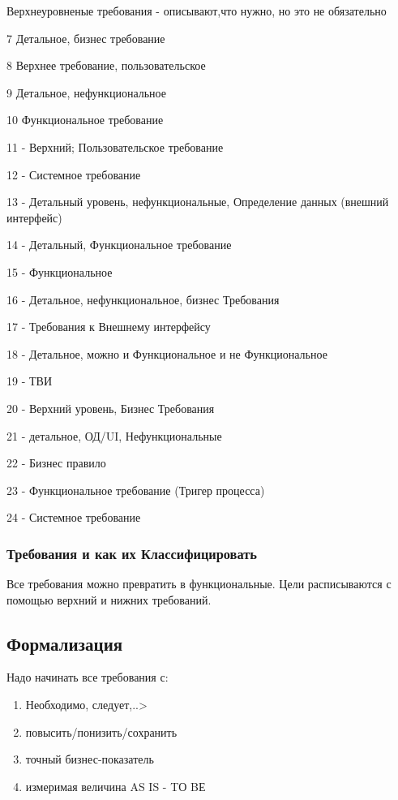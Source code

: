 \documentclass[a4paper,12pt]{article}
\begin{document}
Верхнеуровненые требования - описывают,что нужно, но это не обязательно

7 Детальное, бизнес требование


8 Верхнее требование, пользовательское


9 Детальное, нефункциональное


10 Функциональное требование


11 - Верхний; Пользовательское требование


12 - Системное требование


13 - Детальный уровень, нефункциональные, Определение данных (внешний интерфейс)


14 - Детальный, Функциональное требование


15 - Функциональное


16 - Детальное, нефункциональное, бизнес Требования


17 - Требования к Внешнему интерфейсу


18 - Детальное, можно и Функциональное и не Функциональное


19 - ТВИ


20 - Верхний уровень, Бизнес Требования


21 - детальное, ОД/UI, Нефункциональные


22 - Бизнес правило


23 - Функциональное требование (Тригер процесса)


24 - Системное требование
\subsubsection{Требования и как их Классифицировать}

Все требования можно превратить в функциональные. 
Цели расписываются с помощью верхний и нижних требований.

\subsection{Формализация}

Надо начинать все требования с:


\begin{enumerate}
    \item Необходимо, следует,..>
    \item повысить/понизить/сохранить
    \item точный бизнес-показатель
    \item измеримая величина AS IS - TО BЕ
\end{enumerate}
\end{document}

